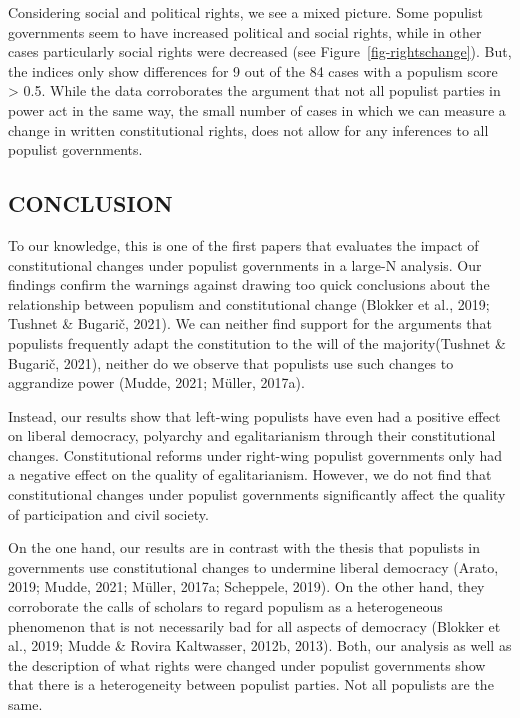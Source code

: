 \documentclass[
  abstract]{article}
\begin{document}
Considering social and political rights, we see a mixed picture. Some
populist governments seem to have increased political and social rights,
while in other cases particularly social rights were decreased (see
Figure~\ref{fig-rightschange}). But, the indices only show differences
for 9 out of the 84 cases with a populism score \textgreater{} 0.5.
While the data corroborates the argument that not all populist parties
in power act in the same way, the small number of cases in which we can
measure a change in written constitutional rights, does not allow for
any inferences to all populist governments.

\hypertarget{conclusion}{%
\subsection{CONCLUSION}\label{conclusion}}

To our knowledge, this is one of the first papers that evaluates the
impact of constitutional changes under populist governments in a large-N
analysis. Our findings confirm the warnings against drawing too quick
conclusions about the relationship between populism and constitutional
change (Blokker et al., 2019; Tushnet \& Bugarič, 2021). We can neither
find support for the arguments that populists frequently adapt the
constitution to the will of the majority(Tushnet \& Bugarič, 2021),
neither do we observe that populists use such changes to aggrandize
power (Mudde, 2021; Müller, 2017a).

Instead, our results show that left-wing populists have even had a
positive effect on liberal democracy, polyarchy and egalitarianism
through their constitutional changes. Constitutional reforms under
right-wing populist governments only had a negative effect on the
quality of egalitarianism. However, we do not find that constitutional
changes under populist governments significantly affect the quality of
participation and civil society.

On the one hand, our results are in contrast with the thesis that
populists in governments use constitutional changes to undermine liberal
democracy (Arato, 2019; Mudde, 2021; Müller, 2017a; Scheppele, 2019). On
the other hand, they corroborate the calls of scholars to regard
populism as a heterogeneous phenomenon that is not necessarily bad for
all aspects of democracy (Blokker et al., 2019; Mudde \& Rovira
Kaltwasser, 2012b, 2013). Both, our analysis as well as the description
of what rights were changed under populist governments show that there
is a heterogeneity between populist parties. Not all populists are the
same.
\end{document}
